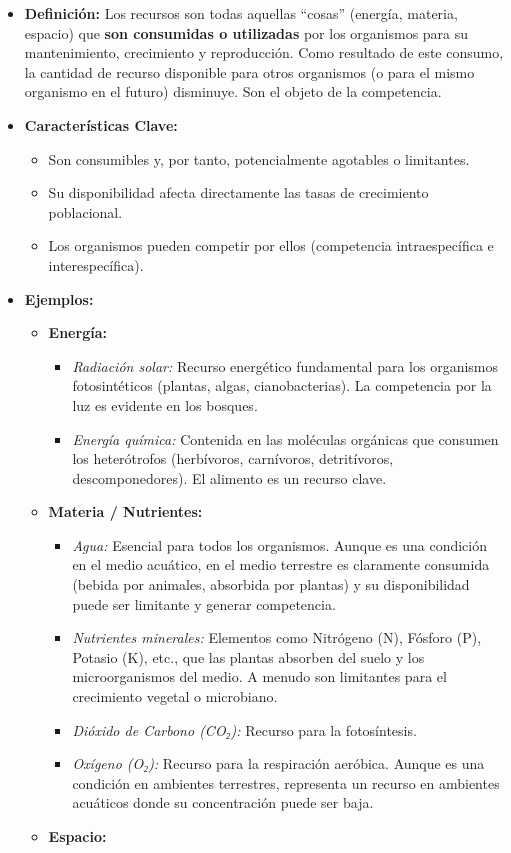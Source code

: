 \documentclass[
]{book}
\providecommand{\tightlist}{%
  \setlength{\itemsep}{0pt}\setlength{\parskip}{0pt}}
\begin{document}
\begin{itemize}
\tightlist
\item
  \textbf{Definición:} Los recursos son todas aquellas ``cosas'' (energía, materia, espacio) que \textbf{son consumidas o utilizadas} por los organismos para su mantenimiento, crecimiento y reproducción. Como resultado de este consumo, la cantidad de recurso disponible para otros organismos (o para el mismo organismo en el futuro) disminuye. Son el objeto de la competencia.
\item
  \textbf{Características Clave:}

  \begin{itemize}
  \tightlist
  \item
    Son consumibles y, por tanto, potencialmente agotables o limitantes.
  \item
    Su disponibilidad afecta directamente las tasas de crecimiento poblacional.
  \item
    Los organismos pueden competir por ellos (competencia intraespecífica e interespecífica).
  \end{itemize}
\item
  \textbf{Ejemplos:}

  \begin{itemize}
  \tightlist
  \item
    \textbf{Energía:}

    \begin{itemize}
    \tightlist
    \item
      \emph{Radiación solar:} Recurso energético fundamental para los organismos fotosintéticos (plantas, algas, cianobacterias). La competencia por la luz es evidente en los bosques.
    \item
      \emph{Energía química:} Contenida en las moléculas orgánicas que consumen los heterótrofos (herbívoros, carnívoros, detritívoros, descomponedores). El alimento es un recurso clave.
    \end{itemize}
  \item
    \textbf{Materia / Nutrientes:}

    \begin{itemize}
    \tightlist
    \item
      \emph{Agua:} Esencial para todos los organismos. Aunque es una condición en el medio acuático, en el medio terrestre es claramente consumida (bebida por animales, absorbida por plantas) y su disponibilidad puede ser limitante y generar competencia.
    \item
      \emph{Nutrientes minerales:} Elementos como Nitrógeno (N), Fósforo (P), Potasio (K), etc., que las plantas absorben del suelo y los microorganismos del medio. A menudo son limitantes para el crecimiento vegetal o microbiano.
    \item
      \emph{Dióxido de Carbono (CO₂):} Recurso para la fotosíntesis.
    \item
      \emph{Oxígeno (O₂):} Recurso para la respiración aeróbica. Aunque es una condición en ambientes terrestres, representa un recurso en ambientes acuáticos donde su concentración puede ser baja.
    \end{itemize}
  \item
    \textbf{Espacio:}


\end{itemize}
\end{itemize}
\end{document}

